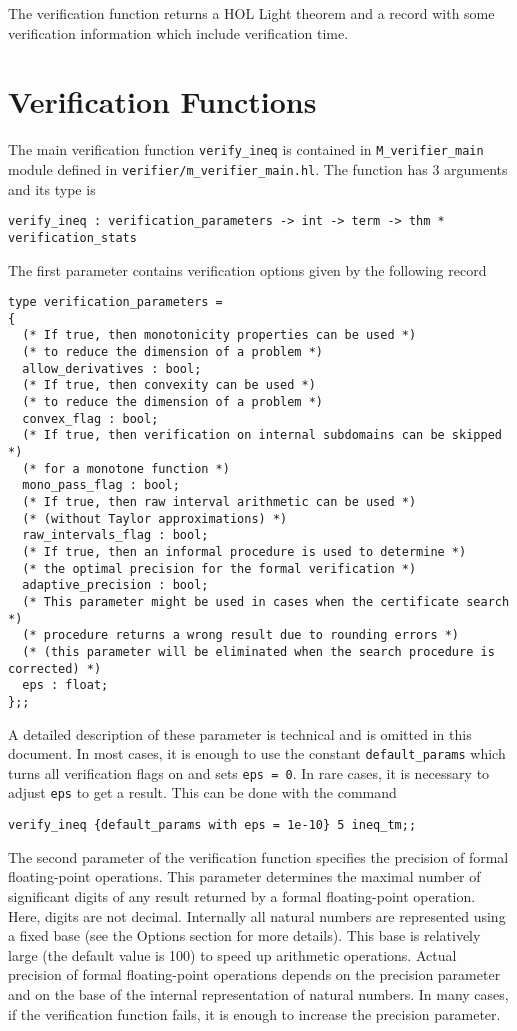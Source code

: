\documentclass[a4paper]{article}
\begin{document}
The verification function returns a HOL Light theorem and a record with some verification information which include verification time.


\section{Verification Functions}
The main verification function \verb|verify_ineq| is contained in \verb|M_verifier_main| module defined in \verb|verifier/m_verifier_main.hl|. The function has 3 arguments and its type is
\begin{verbatim}
verify_ineq : verification_parameters -> int -> term -> thm * verification_stats
\end{verbatim}

The first parameter contains verification options given by the following record
\begin{verbatim}
type verification_parameters =
{
  (* If true, then monotonicity properties can be used *)
  (* to reduce the dimension of a problem *)
  allow_derivatives : bool;
  (* If true, then convexity can be used *)
  (* to reduce the dimension of a problem *)
  convex_flag : bool;
  (* If true, then verification on internal subdomains can be skipped *)
  (* for a monotone function *)
  mono_pass_flag : bool;
  (* If true, then raw interval arithmetic can be used *)
  (* (without Taylor approximations) *)
  raw_intervals_flag : bool;
  (* If true, then an informal procedure is used to determine *)
  (* the optimal precision for the formal verification *)
  adaptive_precision : bool;
  (* This parameter might be used in cases when the certificate search *)
  (* procedure returns a wrong result due to rounding errors *)
  (* (this parameter will be eliminated when the search procedure is corrected) *)
  eps : float;
};;
\end{verbatim}
A detailed description of these parameter is technical and is omitted in this document. In most cases, it is enough to use the constant \verb|default_params| which turns all verification flags on and sets \verb|eps = 0|. In rare cases, it is necessary to adjust \verb|eps| to get a result. This can be done with the command
\begin{verbatim}
verify_ineq {default_params with eps = 1e-10} 5 ineq_tm;;
\end{verbatim}

The second parameter of the verification function specifies the precision of formal floating-point operations. This parameter determines the maximal number of significant digits of any result returned by a formal floating-point operation. Here, digits are not decimal. Internally all natural numbers are represented using a fixed base (see the Options section for more details). This base is relatively large (the default value is 100) to speed up arithmetic operations. Actual precision of formal floating-point operations depends on the precision parameter and on the base of the internal representation of natural numbers. In many cases, if the verification function fails, it is enough to increase the precision parameter.
\end{document}

